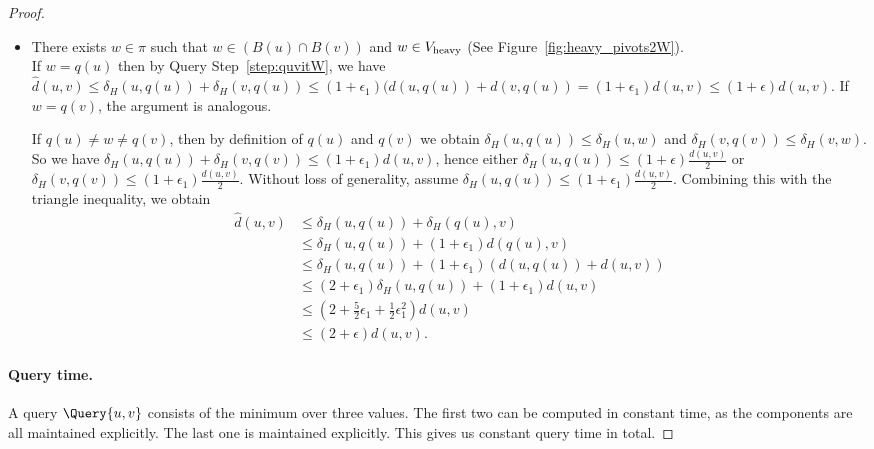 \begin{proof}
\begin{itemize}
\begin{align*}
                &\leq (1+\epsilon_4)(1+\epsilon_2)(d(u,w)+d(v,w))\\
                &= (1+\epsilon_2+\epsilon_2\epsilon_4+\epsilon_4)d(u,v)\\
                &\leq (1+\epsilon)d(u,v).
            \end{align*}
            \item[Case 4:] 
            There exists $w\in \pi$ such that $w\in (B(u)\cap B(v))$ and $w\in V_{\rm{heavy}}$ (See Figure~\ref{fig:heavy_pivots2W}).\\
            If $w=q(u)$ then by Query Step~\ref{step:quvitW}, we have $\hat d(u,v)\leq \delta_H(u,q(u))+\delta_H(v,q(u))\leq (1+\epsilon_1)(d(u,q(u))+d(v,q(u))=(1+\epsilon_1)d(u,v)\leq (1+\epsilon)d(u,v)$. If $w=q(v)$, the argument is analogous. 
            
            If $q(u)\neq w \neq q(v)$, then by definition of $q(u)$ and $q(v)$ we obtain $\delta_H(u,q(u))\leq \delta_H(u,w)$ and $\delta_H(v,q(v))\leq \delta_H(v,w)$. So we have $\delta_H(u,q(u))+\delta_H(v,q(v))\leq (1+\epsilon_1)d(u,v)$, hence either $\delta_H(u,q(u))\leq (1+\epsilon)\tfrac{d(u,v)}{2}$ or $\delta_H(v,q(v))\leq (1+\epsilon_1)\tfrac{d(u,v)}{2}$. Without loss of generality, assume $\delta_H(u,q(u))\leq (1+\epsilon_1) \tfrac{d(u,v)}{2}$. Combining this with the triangle inequality, we obtain
            \begin{align*}
                \hat d(u,v) &\leq \delta_H(u,q(u))+\delta_H(q(u),v)\\
                &\leq \delta_H(u,q(u))+(1+\epsilon_1)d(q(u),v)\\
                &\leq \delta_H(u,q(u))+(1+\epsilon_1)(d(u,q(u))+d(u,v))\\
                &\leq (2+\epsilon_1)\delta_H(u,q(u))+(1+\epsilon_1)d(u,v)\\
                &\leq (2+\tfrac{5}{2}\epsilon_1+\tfrac{1}{2}\epsilon_1^2)d(u,v)\\
                &\leq (2+\epsilon)d(u,v).
            \end{align*}  
    \end{itemize}
            
            
    \paragraph{Query time.}
    A query $\Query{u,v}$ consists of the minimum over three values. The first two can be computed in constant time, as the components are all maintained explicitly. The last one is maintained explicitly. This gives us constant query time in total.
\end{proof}

